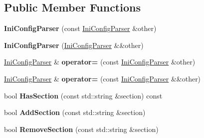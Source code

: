 \subsection*{Public Member Functions}
\begin{DoxyCompactItemize}
\item 
{\bfseries Ini\+Config\+Parser} (const \hyperlink{classlog2hdfs_1_1IniConfigParser}{Ini\+Config\+Parser} \&other)\hypertarget{classlog2hdfs_1_1IniConfigParser_a9d4ef61cd9269503552c45b3290e21de}{}\label{classlog2hdfs_1_1IniConfigParser_a9d4ef61cd9269503552c45b3290e21de}

\item 
{\bfseries Ini\+Config\+Parser} (\hyperlink{classlog2hdfs_1_1IniConfigParser}{Ini\+Config\+Parser} \&\&other)\hypertarget{classlog2hdfs_1_1IniConfigParser_acb529019833028c7c2f3c70793e520a4}{}\label{classlog2hdfs_1_1IniConfigParser_acb529019833028c7c2f3c70793e520a4}

\item 
\hyperlink{classlog2hdfs_1_1IniConfigParser}{Ini\+Config\+Parser} \& {\bfseries operator=} (const \hyperlink{classlog2hdfs_1_1IniConfigParser}{Ini\+Config\+Parser} \&other)\hypertarget{classlog2hdfs_1_1IniConfigParser_ab09d0f609f4c65484547d0230881b606}{}\label{classlog2hdfs_1_1IniConfigParser_ab09d0f609f4c65484547d0230881b606}

\item 
\hyperlink{classlog2hdfs_1_1IniConfigParser}{Ini\+Config\+Parser} \& {\bfseries operator=} (const \hyperlink{classlog2hdfs_1_1IniConfigParser}{Ini\+Config\+Parser} \&\&other)\hypertarget{classlog2hdfs_1_1IniConfigParser_ad8d28b244d3270b5cc29b8fcf72393cf}{}\label{classlog2hdfs_1_1IniConfigParser_ad8d28b244d3270b5cc29b8fcf72393cf}

\item 
bool {\bfseries Has\+Section} (const std\+::string \&section) const \hypertarget{classlog2hdfs_1_1IniConfigParser_ad8353947ca41522c7693d46a49100361}{}\label{classlog2hdfs_1_1IniConfigParser_ad8353947ca41522c7693d46a49100361}

\item 
bool {\bfseries Add\+Section} (const std\+::string \&section)\hypertarget{classlog2hdfs_1_1IniConfigParser_a4a61b4b5843622039e36bb0947a33344}{}\label{classlog2hdfs_1_1IniConfigParser_a4a61b4b5843622039e36bb0947a33344}

\item 
bool {\bfseries Remove\+Section} (const std\+::string \&section)\hypertarget{classlog2hdfs_1_1IniConfigParser_a32b3293011b19876351a27653925cf8c}{}\label{classlog2hdfs_1_1IniConfigParser_a32b3293011b19876351a27653925cf8c}


\end{DoxyCompactItemize}
